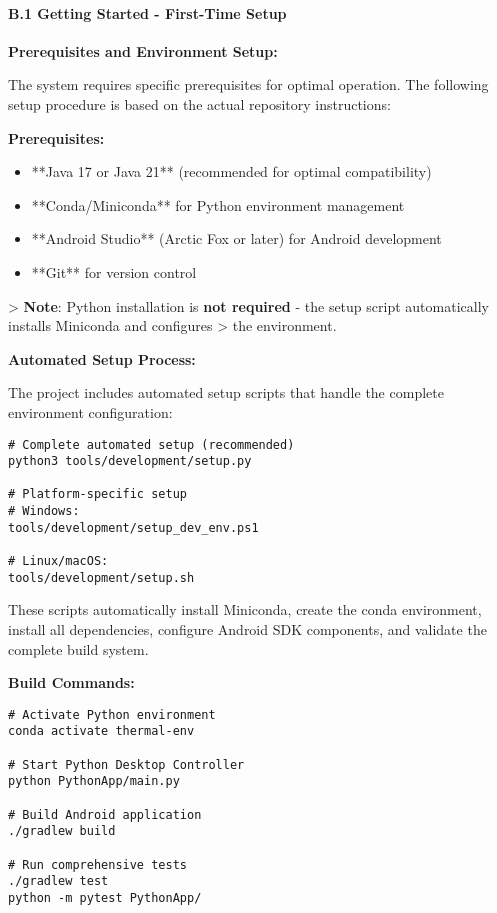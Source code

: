 \documentclass[11pt,a4paper]{article}
\begin{document}
\paragraph{B.1 Getting Started - First-Time Setup}

\textbf{Prerequisites and Environment Setup:}

The system requires specific prerequisites for optimal operation. The following setup procedure is based on the actual
repository instructions:

\textbf{Prerequisites:}

\begin{itemize}
\item **Java 17 or Java 21** (recommended for optimal compatibility)
\item **Conda/Miniconda** for Python environment management
\item **Android Studio** (Arctic Fox or later) for Android development
\item **Git** for version control

\end{itemize}
> \textbf{Note}: Python installation is \textbf{not required} - the setup script automatically installs Miniconda and configures
> the environment.

\textbf{Automated Setup Process:}

The project includes automated setup scripts that handle the complete environment configuration:

\begin{verbatim}
# Complete automated setup (recommended)
python3 tools/development/setup.py

# Platform-specific setup
# Windows:
tools/development/setup_dev_env.ps1

# Linux/macOS:
tools/development/setup.sh
\end{verbatim}

These scripts automatically install Miniconda, create the conda environment, install all dependencies, configure Android
SDK components, and validate the complete build system.

\textbf{Build Commands:}

\begin{verbatim}
# Activate Python environment
conda activate thermal-env

# Start Python Desktop Controller
python PythonApp/main.py

# Build Android application
./gradlew build

# Run comprehensive tests
./gradlew test
python -m pytest PythonApp/
\end{verbatim}
\end{document}
